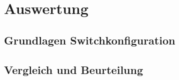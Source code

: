 
\newpage
\section{Auswertung}

    \subsection{Grundlagen Switchkonfiguration}
    
    \newpage
    \subsection{Vergleich und Beurteilung}
    
